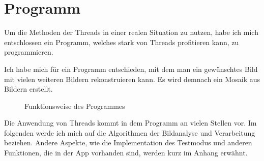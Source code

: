 \section{Programm}\label{Programm}
Um die Methoden der Threads in einer realen Situation zu nutzen, habe ich mich entschlossen ein Programm, welches stark von Threads profitieren kann, zu programmieren.  

Ich habe mich für ein Programm entschieden, mit dem man ein gewünschtes Bild mit vielen weiteren Bildern rekonstruieren kann. Es wird demnach ein Mosaik aus Bildern erstellt.

\begin{figure}[h]
    \centering
    \caption[Programm Funktion]{Funktionsweise des Programmes}
\end{figure}

Die Anwendung von Threads kommt in dem Programm an vielen Stellen vor. Im folgenden werde ich mich auf die Algorithmen der Bildanalyse und Verarbeitung beziehen. Andere Aspekte, wie die Implementation des Testmodus und anderen Funktionen, die in der App vorhanden sind, werden kurz im Anhang erwähnt.